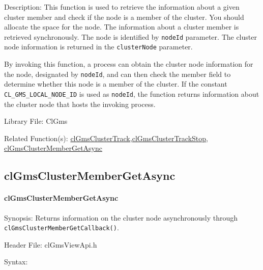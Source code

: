 \begin{flushleft}
\begin{Desc}
\end{Desc}
\begin{Desc}
\item[Description:]This function is used to retrieve the information about a given cluster member and check if the node is a member of the cluster.
You should allocate the space for the node. The information about a cluster member is retrieved synchronously. The node is identified by
{\tt{node\-Id}} parameter. The cluster node information is returned in the {\tt{cluster\-Node}} parameter. \par
 \par
 By invoking this function, a process can obtain the cluster node information for the node, designated by {\tt{node\-Id}}, and can then check the
 member field to determine whether this node is a member of the cluster. If the constant {\tt{CL\_\-GMS\_\-LOCAL\_\-NODE\_\-ID}} is used as 
 {\tt{node\-Id}},  the function returns information about the cluster node that hosts the invoking process.\end{Desc}
\begin{Desc}
\item[Library File:]Cl\-Gms\end{Desc}
\begin{Desc}
\item[Related Function(s):]\hyperlink{pagegms108}{cl\-Gms\-Cluster\-Track},\hyperlink{pagegms109}{cl\-Gms\-Cluster\-Track\-Stop},
\hyperlink{pagegms111}{cl\-Gms\-Cluster\-Member\-Get\-Async} \end{Desc}
\newpage

\subsection{clGmsClusterMemberGetAsync}
\hypertarget{pagegms106}{}\paragraph{cl\-Gms\-Cluster\-Member\-Get\-Async}\label{pagegms106}
\begin{Desc}
\item[Synopsis:]Returns information on the cluster node asynchronously through {\tt{clGmsClusterMemberGetCallback()}}.\end{Desc}
\begin{Desc}
\item[Header File:]clGmsViewApi.h\end{Desc}
\begin{Desc}
\item[Syntax:]


\end{Desc}
\end{flushleft}
